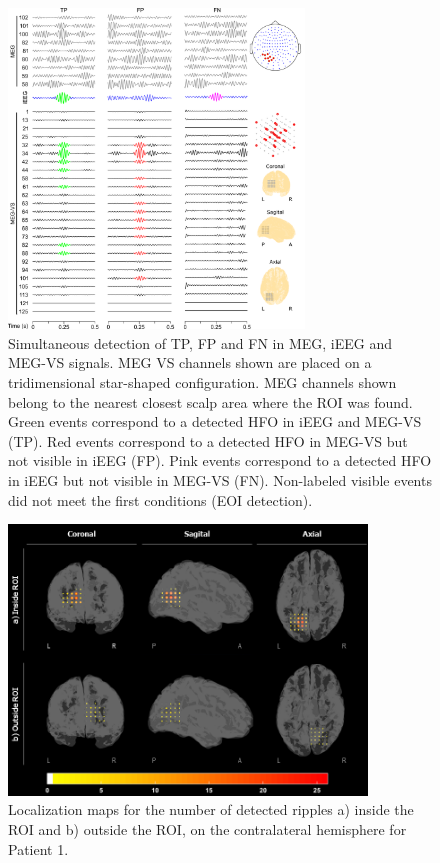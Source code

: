 \begin{figure}[h]
\centering
\includegraphics[width=0.7\textwidth]{Images/fig3-6.png}
\caption{Simultaneous detection of TP, FP and FN in MEG, iEEG and MEG-VS signals. MEG VS channels shown are placed on a tridimensional star-shaped configuration. MEG  channels shown belong to the nearest closest scalp area where the ROI was found. Green events correspond to a detected HFO in iEEG and MEG-VS (TP). Red events correspond to a detected HFO in MEG-VS but not visible in iEEG (FP). Pink events correspond to a detected HFO in iEEG but not visible in MEG-VS (FN). Non-labeled visible events did not meet the first conditions (EOI detection).}
\label{fig:3-6}
\end{figure}

\begin{figure}[h]
\centering
\includegraphics[width=0.85\textwidth]{Images/fig3-7.png}
\caption{Localization maps for the number of detected ripples a) inside the ROI and b) outside the ROI, on the contralateral hemisphere for Patient 1.}
\label{fig:3-7}
\end{figure}


